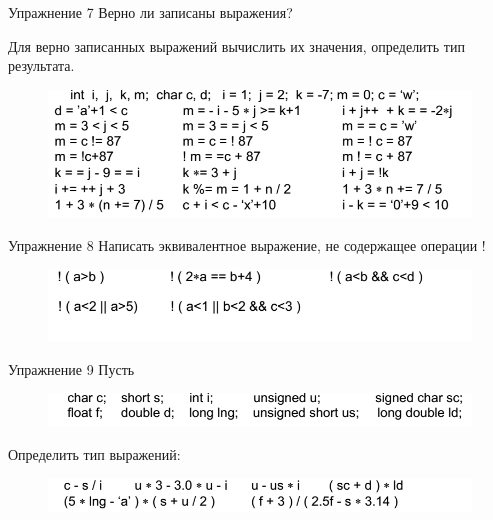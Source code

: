 \documentclass{beamer}
\begin{document}
\begin{frame}{Упражнение 7}
Верно ли записаны выражения? 

Для верно записанных выражений вычислить их значения, определить тип результата. 
\begin{figure}[h]
\centering
\includegraphics[scale=0.5]{images/lec02-pic06-07.png}
\end{figure}
\end{frame}

\begin{frame}{Упражнение 8}
Написать эквивалентное выражение, не содержащее операции !

\begin{figure}[h]
\centering
\includegraphics[scale=0.5]{images/lec02-pic06-08.png}
\end{figure}
\end{frame}

\begin{frame}{Упражнение 9}
Пусть
\begin{figure}[h]
\centering
\includegraphics[scale=0.5]{images/lec02-pic06-09-01.png}
\end{figure}

Определить тип выражений:
\begin{figure}[h]
\centering
\includegraphics[scale=0.5]{images/lec02-pic06-09-02.png}
\end{figure}
\end{frame}
\end{document}
